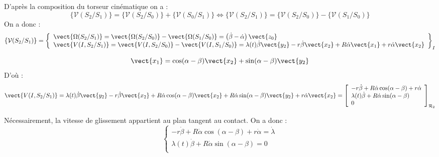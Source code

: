 \ifprof%
\begin{corrige}
D'après la composition du torseur cinématique on a :
$$
\{ \mathcal{V}(S_2/S_1)\} = \{ \mathcal{V}(S_2/S_0)\} + \{ \mathcal{V}(S_0/S_1)\} 
\Longleftrightarrow \{ \mathcal{V}(S_2/S_1)\} = \{ \mathcal{V}(S_2/S_0)\} - \{ \mathcal{V}(S_1/S_0)\} 
$$
On a donc : 
$$
\{ \mathcal{V}(S_2/S_1)\} =
\left\{
\begin{array}{l}
\vect{\Omega(S_2/S_1)} = \vect{\Omega(S_2/S_0)} - \vect{\Omega(S_1/S_0)}  = \left(\dot{\beta}-\dot{\alpha} \right)\vect{z_0} \\
\vect{V(I,S_2/S_1)} = \vect{V(I,S_2/S_0)} - \vect{V(I,S_1/S_0)} 
=
 \lambda(t) \dot{\beta}\vect{y_2} - r\dot{\beta}\vect{x_2} +
 R\dot{\alpha}\vect{x_1} + r\dot{\alpha}\vect{x_2}
\end{array}
\right\}_I
$$


$$ \vect{x_1} 
=\cos(\alpha-\beta)\vect{x_2} + \sin(\alpha-\beta)\vect{y_2}
$$
D'où :
$$
\vect{V(I,S_2/S_1)} =
 \lambda(t) \dot{\beta}\vect{y_2} - r\dot{\beta}\vect{x_2} +
 R\dot{\alpha}\cos(\alpha-\beta)\vect{x_2} +  R\dot{\alpha}\sin(\alpha-\beta)\vect{y_2} + r\dot{\alpha}\vect{x_2}
=\left[
\begin{array}{l}
- r\dot{\beta}+ R\dot{\alpha}\cos(\alpha-\beta) + r\dot{\alpha}\\
 \lambda(t) \dot{\beta}+  R\dot{\alpha}\sin(\alpha-\beta)\\
0\\
\end{array}
\right]_{\mathcal{R}_2}
$$

\end{corrige}
\else \fi



\ifprof%
\begin{corrige}


Nécessairement, la vitesse de glissement appartient au plan tangent au contact. On a donc :
$$
\left\{
\begin{array}{l}
- r\dot{\beta}+ R\dot{\alpha}\cos(\alpha-\beta)  +r\dot{\alpha} = \dot{\lambda}\\
 \lambda(t) \dot{\beta}+  R\dot{\alpha}\sin(\alpha-\beta)=0\\
\end{array}
\right.
$$

\end{corrige}
\else\fi

